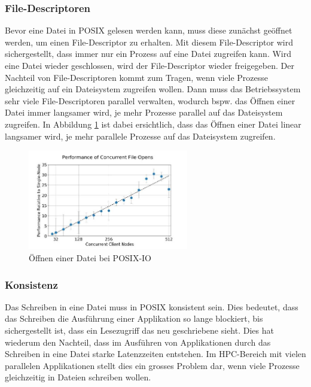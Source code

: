 \subsubsection{File-Descriptoren}
Bevor eine Datei in POSIX gelesen werden kann, muss diese zun\"achst ge\"offnet werden, um einen File-Descriptor zu erhalten. Mit diesem File-Descriptor wird sichergestellt, dass immer nur ein Prozess auf eine Datei zugreifen kann. Wird eine Datei wieder geschlossen, wird der File-Descriptor wieder freigegeben.\newline
Der Nachteil von File-Descriptoren kommt zum Tragen, wenn viele Prozesse gleichzeitig auf ein Dateisystem zugreifen wollen. Dann muss das Betriebssystem sehr viele File-Descriptoren parallel verwalten, wodurch bspw. das \"Offnen einer Datei immer langsamer wird, je mehr Prozesse parallel auf das Dateisystem zugreifen. In Abbildung \ref{fig:posix} ist dabei ersichtlich, dass das \"Offnen einer Datei linear langsamer wird, je mehr parallele Prozesse auf das Dateisystem zugreifen.
\begin{figure}[h]
	\centering
	\includegraphics[width=7cm]{fig/PosixIO.JPG}
	\caption{\"Offnen einer Datei bei POSIX-IO \cite{Lockwood.11.09.2017}}
	\label{fig:posix}
\end{figure}
\subsubsection{Konsistenz}
Das Schreiben in eine Datei muss in POSIX konsistent sein. Dies bedeutet, dass das Schreiben die Ausf\"uhrung einer Applikation so lange blockiert, bis sichergestellt ist, dass ein Lesezugriff das neu geschriebene sieht. Dies hat wiederum den Nachteil, dass im Ausführen von Applikationen durch das Schreiben in eine Datei starke Latenzzeiten entstehen. Im HPC-Bereich mit vielen parallelen Applikationen stellt dies ein grosses Problem dar, wenn viele Prozesse gleichzeitig in Dateien schreiben wollen.
\cite{Lockwood.11.09.2017}
